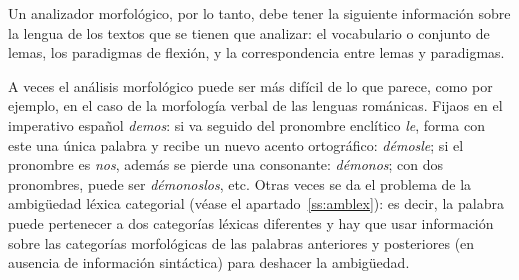 Un analizador morfológico, por lo tanto, debe tener la siguiente información sobre la lengua de los textos que se tienen que analizar: el vocabulario o conjunto de lemas, los paradigmas de flexión, y la correspondencia entre lemas y paradigmas. 

A veces el análisis morfológico puede ser más difícil de lo que parece, como por ejemplo, en el caso de la morfología verbal de las lenguas románicas. Fijaos en el imperativo español \emph{demos}: si va seguido del pronombre enclítico \emph{le}, forma con este una única palabra y recibe un nuevo acento ortográfico: \emph{démosle}; si el pronombre es \emph{nos}, además se pierde una consonante: \emph{démonos}; con dos pronombres, puede ser {\em démonoslos}, etc. Otras veces se da el problema de la ambigüedad léxica categorial (véase el apartado~\ref{ss:amblex}): es decir, la palabra puede pertenecer a dos categorías léxicas diferentes y hay que usar información sobre las categorías morfológicas de las palabras anteriores y posteriores (en ausencia de información sintáctica) para deshacer la ambigüedad. 

